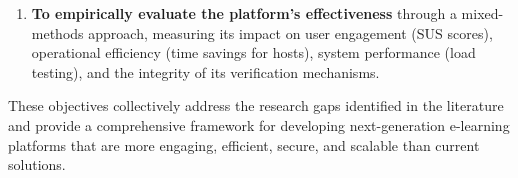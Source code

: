 \begin{enumerate}
    \item \textbf{To empirically evaluate the platform's effectiveness} through a mixed-methods approach, measuring its impact on user engagement (SUS scores), operational efficiency (time savings for hosts), system performance (load testing), and the integrity of its verification mechanisms.
\end{enumerate}

These objectives collectively address the research gaps identified in the literature and provide a comprehensive framework for developing next-generation e-learning platforms that are more engaging, efficient, secure, and scalable than current solutions.
